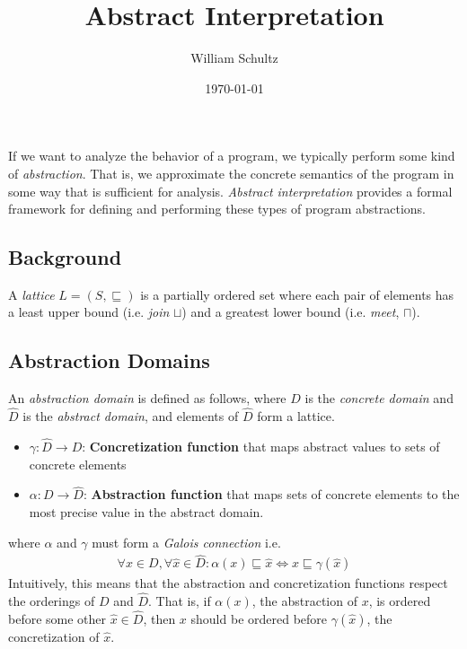 \documentclass[10pt]{article}
\begin{document}
\title{Abstract Interpretation}
\author{William Schultz}
\date{\today}

\maketitle


If we want to analyze the behavior of a program, we typically perform some kind of \textit{abstraction}. That is, we approximate the concrete semantics of the program in some way that is sufficient for analysis. \textit{Abstract interpretation} provides a formal framework for defining and performing these types of program abstractions.

\subsection*{Background}

A \textit{lattice} $L=(S,\sqsubseteq)$ is a partially ordered set where each pair of elements has a least upper bound (i.e. \textit{join} $\sqcup$) and a greatest lower bound (i.e. \textit{meet}, $\sqcap$).

\subsection*{Abstraction Domains}

An \textit{abstraction domain} is defined as follows, where $D$ is the \textit{concrete domain} and $\hat{D}$ is the \textit{abstract domain}, and elements of $\hat{D}$ form a lattice.
\begin{itemize}
    \item $\gamma : \hat{D} \rightarrow D$: \textbf{Concretization function} that maps abstract values to sets of concrete elements
    \item $\alpha : D \rightarrow \hat{D}$: \textbf{Abstraction function} that maps sets of concrete elements to the most precise value in the abstract domain. 
\end{itemize}
where $\alpha$ and $\gamma$ must form a \textit{Galois connection} i.e.
\begin{align*}
    \forall x \in D, \forall \hat{x} \in \hat{D} : \alpha(x) \sqsubseteq \hat{x} \Leftrightarrow x \sqsubseteq \gamma(\hat{x}) 
\end{align*}    
Intuitively, this means that the abstraction and concretization functions respect the orderings of $D$ and $\hat{D}$. That is, if $\alpha(x)$, the abstraction of $x$, is ordered before some other $\hat{x} \in \hat{D}$, then $x$ should be ordered before $\gamma(\hat{x})$, the concretization of $\hat{x}$.
\end{document}
